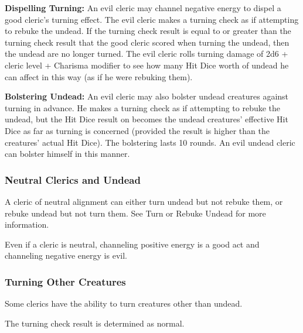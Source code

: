 \textbf{Dispelling Turning:} An evil cleric may channel negative energy to dispel a good cleric's turning effect. The evil cleric makes a turning check as if attempting to rebuke the undead. If the turning check result is equal to or greater than the turning check result that the good cleric scored when turning the undead, then the undead are no longer turned. The evil cleric rolls turning damage of 2d6 + cleric level + Charisma modifier to see how many Hit Dice worth of undead he can affect in this way (as if he were rebuking them).

\textbf{Bolstering Undead:} An evil cleric may also bolster undead creatures against turning in advance. He makes a turning check as if attempting to rebuke the undead, but the Hit Dice result on  becomes the undead creatures' effective Hit Dice as far as turning is concerned (provided the result is higher than the creatures' actual Hit Dice). The bolstering lasts 10 rounds. An evil undead cleric can bolster himself in this manner.

\subsubsection{Neutral Clerics and Undead}
A cleric of neutral alignment can either turn undead but not rebuke them, or rebuke undead but not turn them. See Turn or Rebuke Undead for more information.

Even if a cleric is neutral, channeling positive energy is a good act and channeling negative energy is evil.


\subsubsection{Turning Other Creatures}
Some clerics have the ability to turn creatures other than undead.

The turning check result is determined as normal.